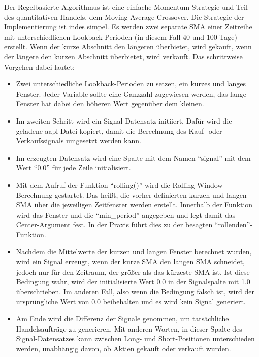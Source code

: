 Der Regelbasierte Algorithmus ist eine einfache Momentum-Strategie und Teil des quantitativen Handels, dem Moving Average Crossover. \cite{willems_2019} Die Strategie der Implementierung ist indes simpel. Es werden zwei separate \ac{SMA} einer Zeitreihe mit unterschiedlichen Lookback-Perioden (in diesem Fall 40 und 100 Tage) erstellt. \cite{willems_2019} Wenn der kurze Abschnitt den längeren überbietet, wird gekauft, wenn der längere den kurzen Abschnitt überbietet, wird verkauft. \cite{willems_2019} Das schrittweise Vorgehen dabei lautet: \cite{willems_2019}
\begin{itemize}
	\item Zwei unterschiedliche Lookback-Perioden zu setzen, ein kurzes und langes Fenster. Jeder Variable sollte eine Ganzzahl zugewiesen werden, das lange Fenster hat dabei den höheren Wert gegenüber dem kleinen.
	
	\item Im zweiten Schritt wird ein Signal Datensatz initiiert. Dafür wird die geladene aapl-Datei kopiert, damit die Berechnung des Kauf- oder Verkaufssignals umgesetzt werden kann.
	
	\item Im erzeugten Datensatz wird eine Spalte mit dem Namen \enquote{signal} mit dem Wert \enquote{0.0} für jede Zeile initialisiert.

	\item Mit dem Aufruf der Funktion \enquote{rolling()} wird die Rolling-Window-Berechnung gestartet. Das heißt, die vorher definierten kurzen und langen \ac{SMA} über die jeweiligen Zeitfenster  werden erstellt. Innerhalb der Funktion wird das Fenster und die \enquote{min\_period} angegeben und legt damit das Center-Argument fest. In der Praxis führt dies zu der besagten \enquote{rollenden}-Funktion.
	
	\item Nachdem die Mittelwerte der kurzen und langen Fenster berechnet wurden, wird ein Signal erzeugt, wenn der kurze \ac{SMA} den langen \ac{SMA} schneidet, jedoch nur für den Zeitraum, der größer als das kürzeste \ac{SMA} ist. Ist diese Bedingung wahr, wird der initialisierte Wert 0.0 in der Signalspalte mit 1.0 überschrieben. Im anderen Fall, also wenn die Bedingung falsch ist, wird der ursprüngliche Wert von 0.0 beibehalten und es wird kein Signal generiert. 

	\item Am Ende wird die Differenz der Signale genommen, um tatsächliche Handelsaufträge zu generieren. Mit anderen Worten, in dieser Spalte des Signal-Datensatzes kann zwischen Long- und Short-Positionen unterschieden werden, unabhängig davon, ob Aktien gekauft oder verkauft wurden.
\end{itemize}


